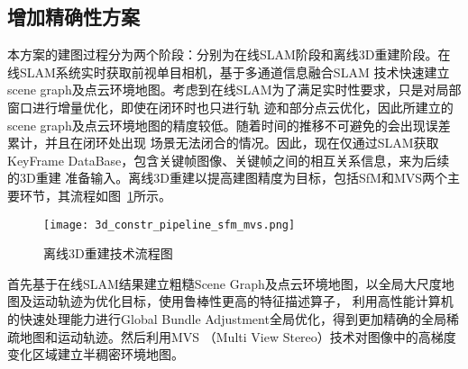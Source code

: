 \subsection{增加精确性方案}
\label{sec:3.3.2}
本方案的建图过程分为两个阶段：分别为在线SLAM阶段和离线3D重建阶段。在线SLAM系统实时获取前视单目相机，基于多通道信息融合SLAM
技术快速建立scene graph及点云环境地图。考虑到在线SLAM为了满足实时性要求，只是对局部窗口进行增量优化，即使在闭环时也只进行轨
迹和部分点云优化，因此所建立的scene graph及点云环境地图的精度较低。随着时间的推移不可避免的会出现误差累计，并且在闭环处出现
场景无法闭合的情况。因此，现在仅通过SLAM获取KeyFrame DataBase，包含关键帧图像、关键帧之间的相互关系信息，来为后续的3D重建
准备输入。离线3D重建以提高建图精度为目标，包括SfM和MVS两个主要环节，其流程如图~\ref{fig:3d_constr_pipeline_sfm_mvs}所示。
\begin{figure}[H] %
  \centering
  \texttt{[image: 3d\_constr\_pipeline\_sfm\_mvs.png]}
  \caption{离线3D重建技术流程图}
  \label{fig:3d_constr_pipeline_sfm_mvs}
\end{figure}
首先基于在线SLAM结果建立粗糙Scene Graph及点云环境地图，以全局大尺度地图及运动轨迹为优化目标，使用鲁棒性更高的特征描述算子，
利用高性能计算机的快速处理能力进行Global Bundle Adjustment全局优化，得到更加精确的全局稀疏地图和运动轨迹。然后利用MVS
（Multi View Stereo）技术对图像中的高梯度变化区域建立半稠密环境地图。




